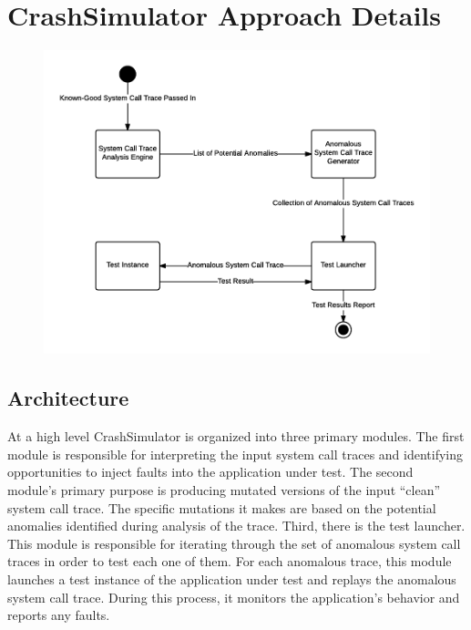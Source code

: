 \section{CrashSimulator Approach Details}

    \begin{figure}[t]
        \center{}
        \includegraphics[scale=.5]{Architecture}
    \end{figure}

    \subsection{Architecture}

        At a high level CrashSimulator is organized into three primary modules. The first module is responsible for
        interpreting the input system call traces and identifying opportunities to inject faults into the application
        under test. The second module's primary purpose is producing mutated versions of the input ``clean'' system call
        trace. The specific mutations it makes are based on the potential anomalies identified during analysis of the
        trace. Third, there is the test launcher. This module is responsible for iterating through the set of anomalous
        system call traces in order to test each one of them. For each anomalous trace, this module launches a test
        instance of the application under test and replays the anomalous system call trace. During this process, it
        monitors the application's behavior and reports any faults.

